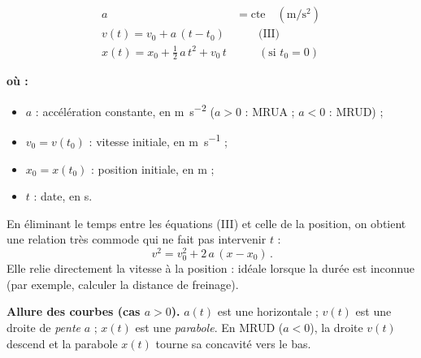 \documentclass[11pt,a4paper]{article}
\newenvironment{ou}{%
  \par\smallskip\noindent\textbf{où :}\nopagebreak
  \begin{itemize}[leftmargin=1.8em,topsep=2pt,itemsep=1.5pt,parsep=0pt]}%
  {\end{itemize}}
\newcommand{\mss}{\si{\metre\per\second\squared}}
\begin{document}
\begin{formule}
\begin{align*}
 a &= \text{cte}\quad(\mss) \\
 \boxed{v(t)=v_0+a\,(t-t_0)} &\qquad\text{(III)} \\
 \boxed{x(t)=x_0+\tfrac{1}{2}\,a\,t^2+v_0\,t} &\qquad(\text{si } t_0=0)
\end{align*}
\begin{ou}
  \item $a$ : accélération constante, en \si{\metre\per\second\squared} ($a>0$ : MRUA ; $a<0$ : MRUD) ;
  \item $v_0=v(t_0)$ : vitesse initiale, en \si{\metre\per\second} ;
  \item $x_0=x(t_0)$ : position initiale, en \si{\metre} ;
  \item $t$ : date, en \si{\second}.
\end{ou}
\end{formule}

\begin{theoreme}
En éliminant le temps entre les équations (III) et celle de la position, on obtient une relation
très commode qui ne fait pas intervenir $t$ :
\[ \boxed{\,v^2=v_0^2+2\,a\,(x-x_0)\,}. \]
Elle relie directement la vitesse à la position : idéale lorsque la durée est inconnue
(par exemple, calculer la distance de freinage).
\end{theoreme}

\noindent\textbf{Allure des courbes (cas $a>0$).} $a(t)$ est une horizontale ; $v(t)$ est une droite
de \emph{pente} $a$ ; $x(t)$ est une \emph{parabole}. En MRUD ($a<0$), la droite $v(t)$ descend et la
parabole $x(t)$ tourne sa concavité vers le bas.
\end{document}
